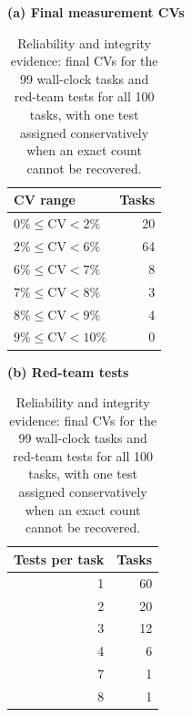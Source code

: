 \begin{table}[H]
  \centering
  \small
  \setlength{\tabcolsep}{7pt}
  \renewcommand{\arraystretch}{1.15}
  \begin{minipage}[t]{0.34\textwidth}
    \vspace{0pt}
    \centering
    \textbf{(a) Final measurement CVs}\par\smallskip
    \begin{tabular}{@{}lr@{}}
      \toprule
      CV range & Tasks \\
      \midrule
      \(0\% \leq \mathrm{CV} < 2\%\) & 20 \\
      \(2\% \leq \mathrm{CV} < 6\%\) & 64 \\
      \(6\% \leq \mathrm{CV} < 7\%\) & 8 \\
      \(7\% \leq \mathrm{CV} < 8\%\) & 3 \\
      \(8\% \leq \mathrm{CV} < 9\%\) & 4 \\
      \(9\% \leq \mathrm{CV} < 10\%\) & 0 \\
      \bottomrule
    \end{tabular}
  \end{minipage}
  \hspace{0.035\textwidth}
  \begin{minipage}[t]{0.27\textwidth}
    \vspace{0pt}
    \centering
    \textbf{(b) Red-team tests}\par\smallskip
    \begin{tabular}{@{}rr@{}}
      \toprule
      Tests per task & Tasks \\
      \midrule
      1 & 60 \\
      2 & 20 \\
      3 & 12 \\
      4 & 6 \\
      7 & 1 \\
      8 & 1 \\
      \bottomrule
    \end{tabular}
  \end{minipage}
  \caption{Reliability and integrity evidence: final CVs for the 99 wall-clock tasks and red-team tests for all 100 tasks, with one test assigned conservatively when an exact count cannot be recovered.}
  \label{tab:perfrace-cv-distribution}
\end{table}
